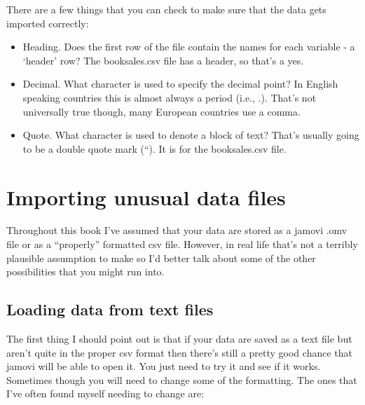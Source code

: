 \documentclass[
]{book}
\providecommand{\tightlist}{%
  \setlength{\itemsep}{0pt}\setlength{\parskip}{0pt}}
\begin{document}
There are a few things that you can check to make sure that the data gets imported correctly:

\begin{itemize}
\tightlist
\item
  Heading. Does the first row of the file contain the names for each variable - a `header' row? The booksales.csv file has a header, so that's a yes.
\item
  Decimal. What character is used to specify the decimal point? In English speaking countries this is almost always a period (i.e., .). That's not universally true though, many European countries use a comma.
\item
  Quote. What character is used to denote a block of text? That's usually going to be a double quote mark (``). It is for the booksales.csv file.
\end{itemize}

\hypertarget{importing-unusual-data-files}{%
\section{Importing unusual data files}\label{importing-unusual-data-files}}

Throughout this book I've assumed that your data are stored as a jamovi .omv file or as a ``properly'' formatted csv file. However, in real life that's not a terribly plausible assumption to make so I'd better talk about some of the other possibilities that you might run into.

\hypertarget{loading-data-from-text-files}{%
\subsection{Loading data from text files}\label{loading-data-from-text-files}}

The first thing I should point out is that if your data are saved as a text file but aren't quite in the proper csv format then there's still a pretty good chance that jamovi will be able to open it. You just need to try it and see if it works. Sometimes though you will need to change some of the formatting. The ones that I've often found myself needing to change are:
\end{document}
